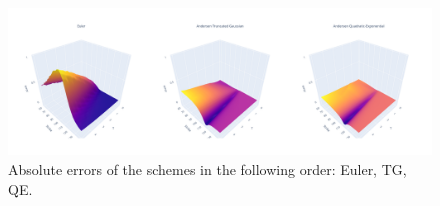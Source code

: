 \documentclass[]{beamer}
\begin{document}
\begin{frame}[t]
\begin{columns}[t]
\begin{column}{\twocolwid}
\begin{columns}[t,totalwidth=\twocolwid]
\begin{column}{\onecolwid}
    \end{column} %
    
    \end{columns} %
    
    
    \begin{figure}
        \label{fig:errors}
        \centering
        \includegraphics[width=\twocolwid]{figures/plot.png}
        \caption{Absolute errors of the schemes in the following order: Euler, TG, QE.}
    \end{figure}
    
    
    \begin{columns}[t,totalwidth=\twocolwid] %
    
    \begin{column}{\onecolwid} %
    
    

\end{column}
\end{columns}
\end{column}
\end{columns}
\end{frame}
\end{document}
